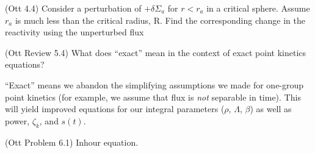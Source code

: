 \documentclass[11pt,addpoints,answers]{exam}
\begin{document}
\begin{questions}
        \question (Ott 4.4) Consider a perturbation of $+\delta \Sigma_a$ 
        for $r< r_a$ in a critical sphere. Assume $r_a$ is much less than the 
        critical radius, R. Find the corresponding change in the reactivity 
        using the unperturbed flux

        \question[5] (Ott Review 5.4) What does ``exact'' mean in the context 
        of exact point kinetics equations?
        \begin{solution}
            ``Exact'' means we abandon the simplifying assumptions we
            made for one-group point kinetics (for example, we assume that
            flux is {\it not} separable in time). This will yield improved
            equations for our integral parameters ($\rho$, $\Lambda$, $\beta$)
            as well as power, $\zeta_{k}$, and $s(t)$.
        \end{solution}
        

        \question (Ott Problem 6.1) Inhour equation.
\end{questions}
\end{document}
